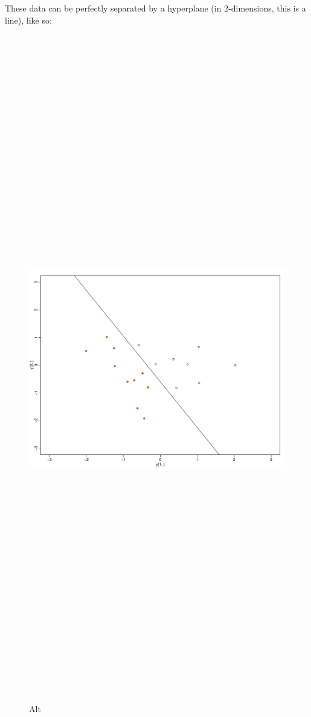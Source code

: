 \documentclass[
]{article}
\begin{document}
These data can be perfectly separated by a hyperplane (in 2-dimensions,
this is a line), like so:

\begin{figure}
\centering
\includegraphics[width=1\textwidth,height=12.5in]{MMChyperplane.pdf}
\caption{Alt}
\end{figure}
\end{document}
